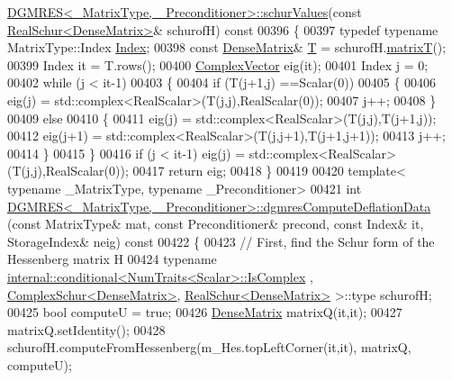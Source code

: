 \begin{DoxyCode}
       \hyperlink{class_eigen_1_1_d_g_m_r_e_s}{DGMRES<\_MatrixType, \_Preconditioner>::schurValues}(\textcolor{keyword}{const} 
      \hyperlink{group___eigenvalues___module_class_eigen_1_1_real_schur}{RealSchur<DenseMatrix>}& schurofH)\textcolor{keyword}{ const}
00396 \textcolor{keyword}{}\{
00397   \textcolor{keyword}{typedef} \textcolor{keyword}{typename} MatrixType::Index \hyperlink{namespace_eigen_a62e77e0933482dafde8fe197d9a2cfde}{Index};
00398   \textcolor{keyword}{const} \hyperlink{group___core___module}{DenseMatrix}& \hyperlink{group___sparse_core___module}{T} = schurofH.\hyperlink{group___eigenvalues___module_abb78996b43b8642a5f507415730445cb}{matrixT}();
00399   Index it = T.rows();
00400   \hyperlink{group___core___module_class_eigen_1_1_matrix}{ComplexVector} eig(it);
00401   Index j = 0;
00402   \textcolor{keywordflow}{while} (j < it-1)
00403   \{
00404     \textcolor{keywordflow}{if} (T(j+1,j) ==Scalar(0))
00405     \{
00406       eig(j) = std::complex<RealScalar>(T(j,j),RealScalar(0)); 
00407       j++; 
00408     \}
00409     \textcolor{keywordflow}{else}
00410     \{
00411       eig(j) = std::complex<RealScalar>(T(j,j),T(j+1,j)); 
00412       eig(j+1) = std::complex<RealScalar>(T(j,j+1),T(j+1,j+1));
00413       j++;
00414     \}
00415   \}
00416   \textcolor{keywordflow}{if} (j < it-1) eig(j) = std::complex<RealScalar>(T(j,j),RealScalar(0));
00417   \textcolor{keywordflow}{return} eig;
00418 \}
00419 
00420 \textcolor{keyword}{template}< \textcolor{keyword}{typename} \_MatrixType, \textcolor{keyword}{typename} \_Preconditioner>
00421 \textcolor{keywordtype}{int} \hyperlink{class_eigen_1_1_d_g_m_r_e_s}{DGMRES<\_MatrixType, \_Preconditioner>::dgmresComputeDeflationData}
      (\textcolor{keyword}{const} MatrixType& mat, \textcolor{keyword}{const} Preconditioner& precond, \textcolor{keyword}{const} Index& it, StorageIndex& neig)\textcolor{keyword}{ const}
00422 \textcolor{keyword}{}\{
00423   \textcolor{comment}{// First, find the Schur form of the Hessenberg matrix H}
00424   \textcolor{keyword}{typename} \hyperlink{struct_eigen_1_1internal_1_1conditional}{internal::conditional<NumTraits<Scalar>::IsComplex}
      , \hyperlink{group___eigenvalues___module_class_eigen_1_1_complex_schur}{ComplexSchur<DenseMatrix>}, \hyperlink{group___eigenvalues___module_class_eigen_1_1_real_schur}{RealSchur<DenseMatrix>} >::type 
      schurofH; 
00425   \textcolor{keywordtype}{bool} computeU = \textcolor{keyword}{true};
00426   \hyperlink{group___core___module}{DenseMatrix} matrixQ(it,it); 
00427   matrixQ.setIdentity();
00428   schurofH.computeFromHessenberg(m\_Hes.topLeftCorner(it,it), matrixQ, computeU); 

\end{DoxyCode}
